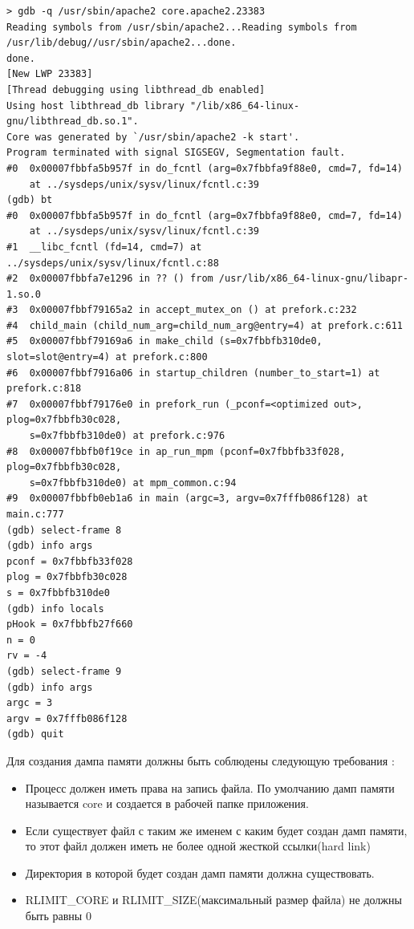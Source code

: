 \documentclass[20pt]{article}
\begin{document}
\begin{lstlisting}
> gdb -q /usr/sbin/apache2 core.apache2.23383
Reading symbols from /usr/sbin/apache2...Reading symbols from /usr/lib/debug//usr/sbin/apache2...done.
done.
[New LWP 23383]
[Thread debugging using libthread_db enabled]
Using host libthread_db library "/lib/x86_64-linux-gnu/libthread_db.so.1".
Core was generated by `/usr/sbin/apache2 -k start'.
Program terminated with signal SIGSEGV, Segmentation fault.
#0  0x00007fbbfa5b957f in do_fcntl (arg=0x7fbbfa9f88e0, cmd=7, fd=14)
    at ../sysdeps/unix/sysv/linux/fcntl.c:39
(gdb) bt
#0  0x00007fbbfa5b957f in do_fcntl (arg=0x7fbbfa9f88e0, cmd=7, fd=14)
    at ../sysdeps/unix/sysv/linux/fcntl.c:39
#1  __libc_fcntl (fd=14, cmd=7) at ../sysdeps/unix/sysv/linux/fcntl.c:88
#2  0x00007fbbfa7e1296 in ?? () from /usr/lib/x86_64-linux-gnu/libapr-1.so.0
#3  0x00007fbbf79165a2 in accept_mutex_on () at prefork.c:232
#4  child_main (child_num_arg=child_num_arg@entry=4) at prefork.c:611
#5  0x00007fbbf79169a6 in make_child (s=0x7fbbfb310de0, slot=slot@entry=4) at prefork.c:800
#6  0x00007fbbf7916a06 in startup_children (number_to_start=1) at prefork.c:818
#7  0x00007fbbf79176e0 in prefork_run (_pconf=<optimized out>, plog=0x7fbbfb30c028,
    s=0x7fbbfb310de0) at prefork.c:976
#8  0x00007fbbfb0f19ce in ap_run_mpm (pconf=0x7fbbfb33f028, plog=0x7fbbfb30c028,
    s=0x7fbbfb310de0) at mpm_common.c:94
#9  0x00007fbbfb0eb1a6 in main (argc=3, argv=0x7fffb086f128) at main.c:777
(gdb) select-frame 8
(gdb) info args
pconf = 0x7fbbfb33f028
plog = 0x7fbbfb30c028
s = 0x7fbbfb310de0
(gdb) info locals
pHook = 0x7fbbfb27f660
n = 0
rv = -4
(gdb) select-frame 9
(gdb) info args
argc = 3
argv = 0x7fffb086f128
(gdb) quit
\end{lstlisting}

Для создания дампа памяти должны быть соблюдены следующую требования \cite{man/coredump}:
\begin{itemize}
  \item Процесс должен иметь права на запись файла. По умолчанию дамп памяти
  называется core и создается в рабочей папке приложения.
  \item Если существует файл с таким же именем с каким будет создан дамп памяти,
  то этот файл должен иметь не более одной жесткой ссылки(hard link)
  \item Директория в которой будет создан дамп памяти должна существовать.
  \item RLIMIT\_CORE и RLIMIT\_SIZE(максимальный размер файла) не должны быть равны 0
\end{itemize}
\end{document}
